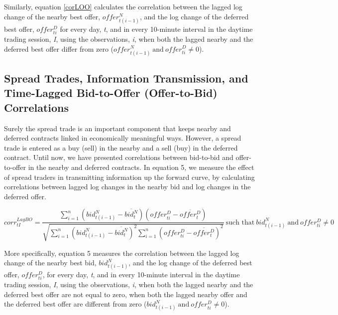 \documentclass[]{elsarticle} %
\begin{document}
Similarly, equation \ref{corLOO} calculates the correlation between the
lagged log change of the nearby best offer, \(offer_{t(i-1)}^N\), and
the log change of the deferred best offer, \(offer_{ti}^D\) for every
day, \emph{t}, and in every 10-minute interval in the daytime trading
session, \emph{I}, using the observations, \emph{i}, when both the
lagged nearby and the deferred best offer differ from zero
(\({offer_{t(i-1)}^N \: \textrm{and} \: offer_{ti}^D} \neq 0\)).

\subsection{Spread Trades, Information Transmission, and Time-Lagged
Bid-to-Offer (Offer-to-Bid)
Correlations}\label{spread-trades-information-transmission-and-time-lagged-bid-to-offer-offer-to-bid-correlations}

Surely the spread trade is an important component that keeps nearby and
deferred contracts linked in economically meaningful ways. However, a
spread trade is entered as a buy (sell) in the nearby and a sell (buy)
in the deferred contract. Until now, we have presented correlations
between bid-to-bid and offer-to-offer in the nearby and deferred
contracts. In equation 5, we measure the effect of spread traders in
transmitting information up the forward curve, by calculating
correlations between lagged log changes in the nearby bid and log
changes in the deferred offer.

\begin{equation} \label{corrLBO}
corr^{LagBO}_{tI} = \frac{\sum\limits_{i=1}^{n} \left(bid_{t(i-1)}^N - \overline{bid_t^N}\right) \left(offer_{ti}^D - \overline{offer_t^D}\right)}{\sqrt{\sum\limits_{i=1}^{n} \left(bid_{t(i-1)}^N - \overline{bid_t^N}\right)^2 \sum\limits_{i=1}^{n}\left(offer_{ti}^D - \overline{offer_t^D}\right)^2}} \: \textrm{such that} \: {bid_{t(i-1)}^N \: \textrm{and} \: offer_{ti}^D} \neq 0
\end{equation}

More specifically, equation 5 measures the correlation between the
lagged log change of the nearby best bid, \(bid_{t(i-1)}^N\), and the
log change of the deferred best offer, \(offer_{ti}^D\), for every day,
\emph{t}, and in every 10-minute interval in the daytime trading
session, \emph{I}, using the observations, \emph{i}, when both the
lagged nearby and the deferred best offer are not equal to zero, when
both the lagged nearby offer and the deferred best offer are different
from zero (\({bid_{t(i-1)}^N \: \textrm{and} \: offer_{ti}^D} \neq 0\)).
\end{document}
